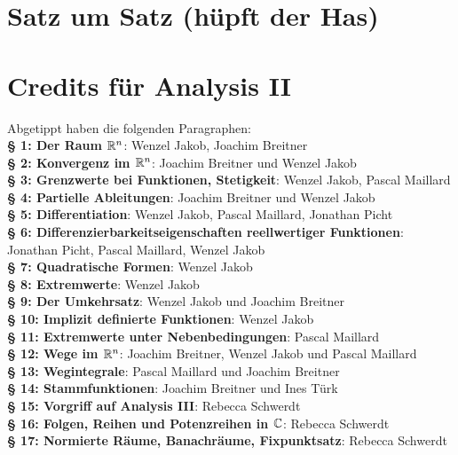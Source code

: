 \documentclass[a4paper,twoside,DIV15,BCOR12mm,chapterprefix=true,headings=twolinechapter]{scrbook}
\begin{document}
\appendix
\chapter{Satz um Satz (hüpft der Has)}

\renewcommand{\indexname}{Stichwortverzeichnis}
\printindex

\chapter{Credits für Analysis II} Abgetippt haben die folgenden Paragraphen:\\%
\textbf{§ 1: Der Raum $\mathbb{R}^n$}: Wenzel Jakob, Joachim Breitner\\
\textbf{§ 2: Konvergenz im $\mathbb{R}^n$}: Joachim Breitner und Wenzel Jakob\\
\textbf{§ 3: Grenzwerte bei Funktionen, Stetigkeit}: Wenzel Jakob, Pascal Maillard\\
\textbf{§ 4: Partielle Ableitungen}: Joachim Breitner und Wenzel Jakob\\
\textbf{§ 5: Differentiation}: Wenzel Jakob, Pascal Maillard, Jonathan Picht\\
\textbf{§ 6: Differenzierbarkeitseigenschaften reellwertiger Funktionen}: Jonathan Picht, Pascal Maillard, Wenzel Jakob\\
\textbf{§ 7: Quadratische Formen}: Wenzel Jakob\\
\textbf{§ 8: Extremwerte}: Wenzel Jakob\\
\textbf{§ 9: Der Umkehrsatz}: Wenzel Jakob und Joachim Breitner\\
\textbf{§ 10: Implizit definierte Funktionen}: Wenzel Jakob\\
\textbf{§ 11: Extremwerte unter Nebenbedingungen}: Pascal Maillard\\
\textbf{§ 12: Wege im $\mathbb{R}^n$}: Joachim Breitner, Wenzel Jakob und Pascal Maillard\\
\textbf{§ 13: Wegintegrale}: Pascal Maillard und Joachim Breitner\\
\textbf{§ 14: Stammfunktionen}: Joachim Breitner und Ines Türk\\
\textbf{§ 15: Vorgriff auf Analysis III}: Rebecca Schwerdt\\
\textbf{§ 16: Folgen, Reihen und Potenzreihen in $\mathbb{C}$}: Rebecca Schwerdt\\
\textbf{§ 17: Normierte Räume, Banachräume, Fixpunktsatz}: Rebecca Schwerdt\\
\end{document}
